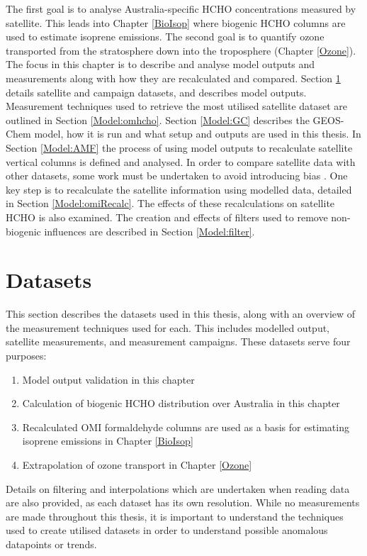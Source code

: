   The first goal is to analyse Australia-specific HCHO concentrations measured by satellite.
  This leads into Chapter \ref{BioIsop} where biogenic HCHO columns are used to estimate isoprene emissions.
  The second goal is to quantify ozone transported from the stratosphere down into the troposphere (Chapter \ref{Ozone}).
  The focus in this chapter is to describe and analyse model outputs and measurements along with how they are recalculated and compared.
  Section \ref{Model:datasets} details satellite and campaign datasets, and describes model outputs.
  Measurement techniques used to retrieve the most utilised satellite dataset are outlined in Section \ref{Model:omhcho}.
  Section \ref{Model:GC} describes the GEOS-Chem model, how it is run and what setup and outputs are used in this thesis.
  In Section \ref{Model:AMF} the process of using model outputs to recalculate satellite vertical columns is defined and analysed.
  In order to compare satellite data with other datasets, some work must be undertaken to avoid introducing bias \parencite[e.g.,][]{Palmer2001, Eskes2003, Marais2012, Lamsal2014}.
  One key step is to recalculate the satellite information using modelled data, detailed in Section \ref{Model:omiRecalc}.
  The effects of these recalculations on satellite HCHO is also examined.
  The creation and effects of filters used to remove non-biogenic influences are described in Section \ref{Model:filter}.
  
  

\section{Datasets}
  \label{Model:datasets}
  
  This section describes the datasets used in this thesis, along with an overview of the measurement techniques used for each.
  This includes modelled output, satellite measurements, and measurement campaigns.
  These datasets serve four purposes: 
  \begin{enumerate}
    \item Model output validation in this chapter
    \item Calculation of biogenic HCHO distribution over Australia in this chapter
    \item Recalculated OMI formaldehyde columns are used as a basis for estimating isoprene emissions in Chapter \ref{BioIsop}
    \item Extrapolation of ozone transport in Chapter \ref{Ozone}
  \end{enumerate}
  Details on filtering and interpolations which are undertaken when reading data are also provided, as each dataset has its own resolution.
  While no measurements are made throughout this thesis, it is important to understand the techniques used to create utilised datasets in order to understand possible anomalous datapoints or trends.
  
